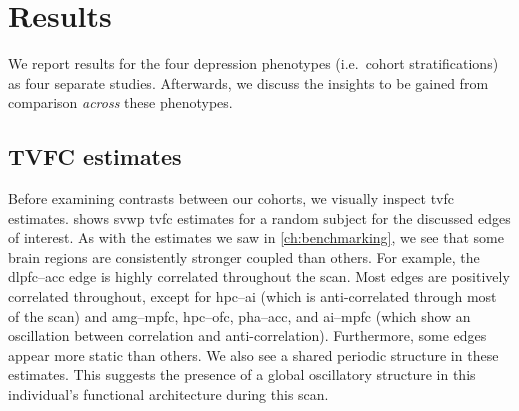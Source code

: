\clearpage
\section{Results}\label{sec:ukb-results}

We report results for the four depression phenotypes (i.e.~cohort stratifications) as four separate studies.
Afterwards, we discuss the insights to be gained from comparison \emph{across} these phenotypes.

\subsection{TVFC estimates}

Before examining contrasts between our cohorts, we visually inspect \gls{tvfc} estimates.
 shows \gls{svwp} \gls{tvfc} estimates for a random subject for the discussed edges of interest.
%
As with the estimates we saw in \cref{ch:benchmarking}, we see that some brain regions are consistently stronger coupled than others.
For example, the \gls{dlpfc}--\gls{acc} edge is highly correlated throughout the scan.
Most edges are positively correlated throughout, except for \gls{hpc}--\gls{ai} (which is anti-correlated through most of the scan) and \gls{amg}--\gls{mpfc}, \gls{hpc}--\gls{ofc}, \gls{pha}--\gls{acc}, and \gls{ai}--\gls{mpfc} (which show an oscillation between correlation and anti-correlation).
Furthermore, some edges appear more static than others.
We also see a shared periodic structure in these estimates.
This suggests the presence of a global oscillatory structure in this individual's functional architecture during this scan.


